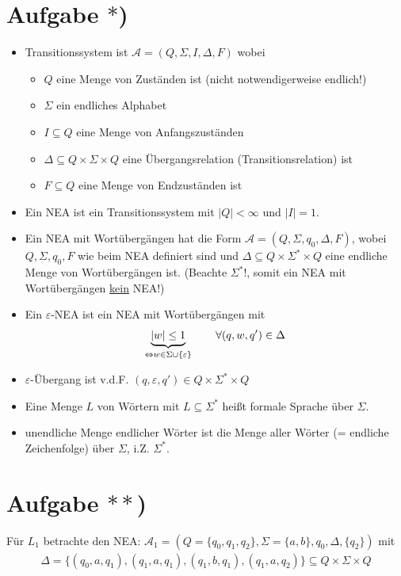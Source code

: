 \documentclass[12pt,a4paper]{article}
\author{Willi Sontopski}
\newcommand{\A}{\mathcal{A}}
\begin{document}

\section*{Aufgabe $\ast$)}
\begin{itemize}
\item Transitionssystem ist $\A=(Q,\Sigma,I,\Delta,F)$ wobei
\begin{itemize}
\item $Q$ eine Menge von Zuständen ist (nicht notwendigerweise endlich!)
\item $\Sigma$ ein endliches Alphabet
\item $I\subseteq Q$ eine Menge von Anfangszuständen
\item $\Delta\subseteq Q\times\Sigma\times Q$ eine Übergangsrelation (Transitionsrelation) ist
\item $F\subseteq Q$ eine Menge von Endzuständen ist
\end{itemize}
\item Ein NEA ist ein Transitionssystem mit $|Q|<\infty$ und $|I|=1$.
\item Ein NEA mit Wortübergängen hat die Form $\A=(Q,\Sigma,q_0,\Delta,F)$, wobei $Q,\Sigma,q_0,F$ wie beim NEA definiert sind und $\Delta\subseteq Q\times \Sigma^\ast\times Q$ eine endliche Menge von Wortübergängen ist. (Beachte $\Sigma^\ast$!, somit ein NEA mit Wortübergängen \underline{kein} NEA!)
\item Ein $\varepsilon$-NEA ist ein NEA mit Wortübergängen mit
\begin{align*}
\underbrace{|w|\leq1}_{\Leftrightarrow w\in\Sigma\cup\lbrace\varepsilon\rbrace}\qquad\forall(q,w,q')\in\Delta
\end{align*}
\item $\varepsilon$-Übergang ist v.d.F. $(q,\varepsilon,q')\in Q\times\Sigma^\ast\times Q$
\item Eine Menge $L$ von Wörtern mit $L\subseteq\Sigma^\ast$ heißt formale Sprache über $\Sigma$.
\item unendliche Menge endlicher Wörter ist die Menge aller Wörter (= endliche Zeichenfolge) über $\Sigma$, i.Z. $\Sigma^\ast$.
\end{itemize}

\section*{Aufgabe $\ast\ast$)}
Für $L_1$ betrachte den NEA: $\A_1=(Q=\lbrace q_0,q_1,q_2\rbrace,\Sigma=\lbrace a,b\rbrace,q_0,\Delta,\lbrace q_2\rbrace)$ mit
\begin{align*}
\Delta=\lbrace (q_0,a,q_1),(q_1,a,q_1),(q_1,b,q_1),(q_1,a,q_2)\rbrace\subseteq Q\times\Sigma\times Q
\end{align*}
\end{document}
